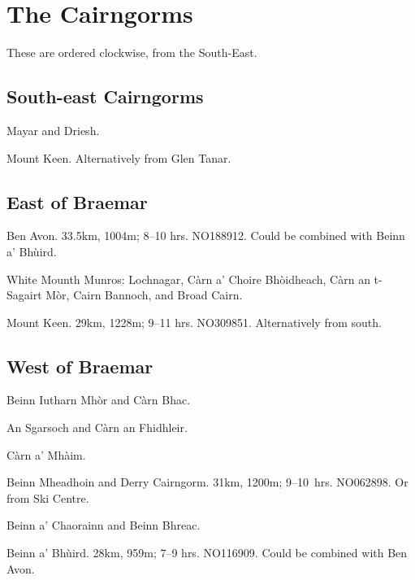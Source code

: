 \section{The Cairngorms}

These are ordered clockwise, from the South-East.

\subsection{South-east Cairngorms}

\begin{munros}
\item Mayar and Driesh. \tick

\item Mount Keen.  Alternatively from Glen Tanar. 
\end{munros}


\subsection{East of Braemar}

\begin{munros}
\item \target Ben Avon.  33.5km, 1004m; 8--10 hrs.  NO188912.  Could be combined
  with Beinn a' Bhùird.  \tick

\item \target White Mounth Munros: Lochnagar, Càrn a' Choire Bhòidheach, Càrn an
  t-Sagairt Mòr, Cairn Bannoch, and Broad Cairn.  \tick

\item Mount Keen.  29km, 1228m; 9--11 hrs.  NO309851.  Alternatively from
  south.  \tick
\end{munros}



\subsection{West of Braemar}

\begin{munros}
\item Beinn Iutharn Mhòr and Càrn Bhac.

\item An Sgarsoch and Càrn an Fhidhleir.

\item Càrn a' Mhàim.

\item\target Beinn Mheadhoin and Derry Cairngorm.  31km, 1200m; 9--10~hrs.
  NO062898.  Or from Ski Centre.  \tick

\item Beinn a' Chaorainn and Beinn Bhreac.


\item \target Beinn a' Bhùird.  28km, 959m; 7--9 hrs.  NO116909.  Could be
  combined with Ben Avon.  \tick
\end{munros}

